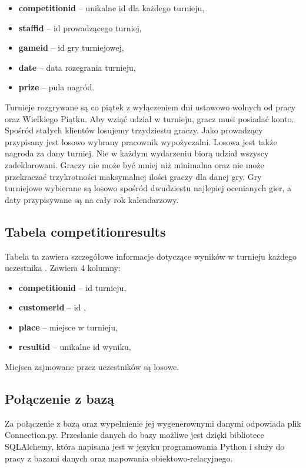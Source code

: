 \documentclass{article}
\begin{document}
		\begin{itemize}
			\setlength{\itemsep}{-2pt}
			\item \textbf{competition\textunderscore id} – unikalne id dla każdego turnieju,
			\item \textbf{staff\textunderscore id} –  id prowadzącego turniej,
			\item \textbf{game\textunderscore id} – id gry turniejowej,
			\item \textbf{date} – data rozegrania turnieju,
			\item \textbf{prize} – pula nagród.
		\end{itemize}

	\noindent Turnieje rozgrywane są co piątek z wyłączeniem dni ustawowo wolnych od pracy oraz Wielkiego Piątku. Aby wziąć udział w turnieju, gracz musi posiadać konto. Spośród stałych klientów losujemy trzydziestu graczy. Jako prowadzący przypisany jest losowo wybrany pracownik wypożyczalni. Losowa jest także nagroda za dany turniej. Nie w każdym wydarzeniu biorą udział wszyscy zadeklarowani. Graczy nie może być mniej niż minimalna oraz nie może przekraczać trzykrotności maksymalnej ilości graczy dla danej gry. Gry turniejowe wybierane są losowo spośród dwudziestu najlepiej ocenianych gier, a daty przypisywane są na cały rok kalendarzowy.
	
	\subsection{Tabela competition\textunderscore results}

	Tabela ta zawiera szczegółowe informacje dotyczące wyników w turnieju każdego uczestnika . Zawiera 4 kolumny:

		\begin{itemize}
			\setlength{\itemsep}{-2pt}
			\item \textbf{competition\textunderscore id} – id turnieju,
			\item \textbf{customer\textunderscore id} – id ,
			\item \textbf{place} – miejsce w turnieju,
			\item \textbf{result\textunderscore id} – unikalne id wyniku,
		\end{itemize}
	Miejsca zajmowane przez uczestników są losowe. 

	\subsection{Połączenie z bazą}
	Za połączenie z bazą oraz wypełnienie jej wygenerownymi danymi odpowiada plik Connection.py. Przesłanie danych do bazy możliwe jest dzięki bibliotece SQLAlchemy, która napisana jest w języku programowania Python i służy do pracy z bazami danych oraz mapowania obiektowo-relacyjnego.\\
	
\end{document}
